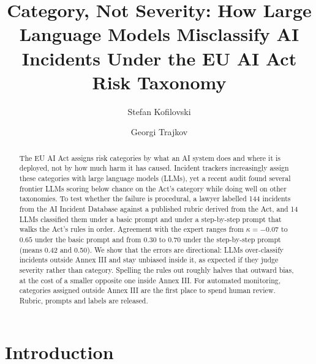\documentclass[sigconf,natbib=false, language=english]{acmart}
\begin{document}
\title[Category, Not Severity]{Category, Not Severity: How Large Language Models
  Misclassify AI Incidents Under the EU AI Act Risk Taxonomy}

\author{Stefan Kofilovski}

\author{Georgi Trajkov}

\begin{abstract}
The EU AI Act assigns risk categories by what an AI system does and where it is
deployed, not by how much harm it has caused. Incident trackers increasingly assign
these categories with large language models (LLMs), yet a recent audit found several
frontier LLMs scoring below chance on the Act's category while doing well on other
taxonomies. To test whether the failure is procedural, a lawyer labelled 144 incidents
from the AI Incident Database against a published rubric derived from the Act, and 14
LLMs classified them under a basic prompt and under a step-by-step prompt that walks
the Act's rules in order. Agreement with the expert ranges from $\kappa = -0.07$ to
$0.65$ under the basic prompt and from $0.30$ to $0.70$ under the step-by-step prompt
(means 0.42 and 0.50). We show that the errors are directional: LLMs over-classify
incidents outside Annex III and stay unbiased inside it, as expected if they judge
severity rather than category. Spelling the rules out roughly halves that outward
bias, at the cost of a smaller opposite one inside Annex III. For automated
monitoring, categories assigned outside Annex III are the first place to spend human
review. Rubric, prompts and labels are released.
\end{abstract}


\maketitle

\section{Introduction}
\end{document}
